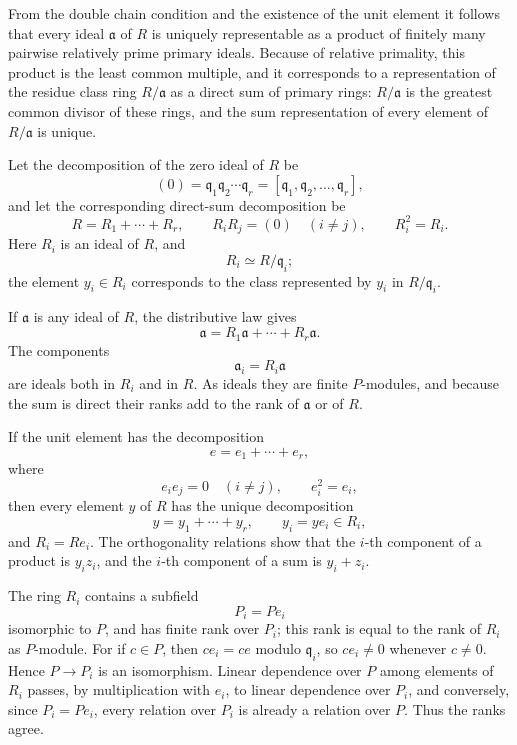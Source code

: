 \documentclass[
  12pt,
]{article}
\begin{document}
From the double chain condition and the existence of the unit element it
follows that every ideal \(\mathfrak a\) of \(R\) is uniquely
representable as a product of finitely many pairwise relatively prime
primary ideals. Because of relative primality, this product is the least
common multiple, and it corresponds to a representation of the residue
class ring \(R/\mathfrak a\) as a direct sum of primary rings:
\(R/\mathfrak a\) is the greatest common divisor of these rings, and the
sum representation of every element of \(R/\mathfrak a\) is unique.

Let the decomposition of the zero ideal of \(R\) be \[
  (0)=\mathfrak q_1\mathfrak q_2\cdots\mathfrak q_r
      =[\mathfrak q_1,\mathfrak q_2,\ldots,\mathfrak q_r],
\] and let the corresponding direct-sum decomposition be \[
  R=R_1+
  \cdots+R_r,
  \qquad R_i R_j=(0)\quad (i\ne j),
  \qquad R_i^2=R_i.
\] Here \(R_i\) is an ideal of \(R\), and \[
  R_i\simeq R/\mathfrak q_i;
\] the element \(y_i\in R_i\) corresponds to the class represented by
\(y_i\) in \(R/\mathfrak q_i\).

If \(\mathfrak a\) is any ideal of \(R\), the distributive law gives \[
  \mathfrak a=R_1\mathfrak a+
  \cdots+R_r\mathfrak a.
\] The components \[
  \mathfrak a_i=R_i\mathfrak a
\] are ideals both in \(R_i\) and in \(R\). As ideals they are finite
\(P\)-modules, and because the sum is direct their ranks add to the rank
of \(\mathfrak a\) or of \(R\).

If the unit element has the decomposition \[
  e=e_1+
\cdots+e_r,
\] where \[
  e_i e_j=0\quad(i\ne j),
  \qquad e_i^2=e_i,
\] then every element \(y\) of \(R\) has the unique decomposition \[
  y=y_1+
\cdots+y_r,
  \qquad y_i=ye_i\in R_i,
\] and \(R_i=Re_i\). The orthogonality relations show that the \(i\)-th
component of a product is \(y_i z_i\), and the \(i\)-th component of a
sum is \(y_i+z_i\).

The ring \(R_i\) contains a subfield \[
  P_i=Pe_i
\] isomorphic to \(P\), and has finite rank over \(P_i\); this rank is
equal to the rank of \(R_i\) as \(P\)-module. For if \(c\in P\), then
\(ce_i=ce\) modulo \(\mathfrak q_i\), so \(ce_i\ne0\) whenever
\(c\ne0\). Hence \(P\to P_i\) is an isomorphism. Linear dependence over
\(P\) among elements of \(R_i\) passes, by multiplication with \(e_i\),
to linear dependence over \(P_i\), and conversely, since \(P_i=Pe_i\),
every relation over \(P_i\) is already a relation over \(P\). Thus the
ranks agree.
\end{document}
